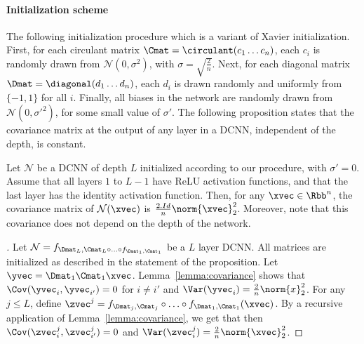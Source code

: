 \paragraph{Initialization scheme}
The following initialization procedure which is a variant of Xavier initialization.
First, for each circulant matrix $\Cmat = \circulant (c_{1} \ldots c_{n})$, each $c_{i}$ is randomly drawn from $\mathcal{N} \left(0,\sigma^{2}\right)$, with $\sigma=\sqrt{\frac{2}{n}}$.
Next, for each diagonal matrix $\Dmat = \diagonal (d_{1} \ldots d_{n})$, each $d_{i}$ is drawn randomly and uniformly from $\{-1,1\}$ for all $i$.
Finally, all biases in the network are randomly drawn from $\mathcal{N}\left(0,\sigma'^{2}\right)$, for some small value of $\sigma'$.
The following proposition states that the covariance matrix at the output of any layer in a DCNN, independent of the depth, is constant.

\begin{proposition} \label{proposition:initialization}
Let $\mathcal{N}$ be a DCNN of depth $L$ initialized according to our procedure, with $\sigma'=0$.
Assume that all layers $1$ to $L-1$ have ReLU activation functions, and that the last layer has the identity activation function.
Then, for any $\xvec \in \Rbb^{n}$, the covariance matrix of $\mathcal{N}(\xvec)$ is $\frac{2.Id}{n}\norm{\xvec}_{2}^{2}$.
Moreover, note that this covariance does not depend on the depth of the network.
\end{proposition}

\begin{proof}[]
Let $\mathcal{N} = f_{\Dmat_{L}, \Cmat_{L} \circ \ldots \circ f_{\Dmat_{1}, \Cmat_{1}}}$ be a $L$ layer DCNN.
All matrices are initialized as described in the statement of the proposition.
Let $\yvec = \Dmat_{1} \Cmat_{1} \xvec$.
Lemma~\ref{lemma:covariance} shows that $\Cov(\yvec_{i}, \yvec_{i'}) = 0$ for $i \neq i'$ and $\Var(\yvec_{i}) = \frac{2}{n}\norm{x}_{2}^{2}$.
For any $j \le L$, define $\zvec^j = f_{\Dmat_j, \Cmat_j} \circ \ldots \circ f_{\Dmat_1, \Cmat_1}(\xvec)$.
By a recursive application of Lemma~\ref{lemma:covariance}, we get that then $\Cov(\zvec_i^j, \zvec_{i'}^j) = 0$ and $\Var(\zvec_i^j) = \frac{2}{n} \norm{\xvec}_2^2$.
\end{proof}

